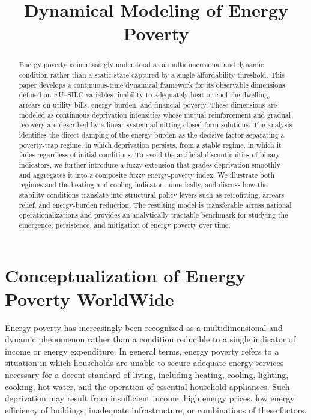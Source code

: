 \documentclass[11pt,a4paper]{article}
\title{Dynamical Modeling of Energy Poverty}
\author{}
\date{}
\begin{document}
\maketitle

\begin{abstract}
Energy poverty is increasingly understood as a multidimensional and dynamic
condition rather than a static state captured by a single affordability
threshold. This paper develops a continuous-time dynamical framework for its
observable dimensions defined on EU--SILC variables: inability to adequately
heat or cool the dwelling, arrears on utility bills, energy burden, and
financial poverty. These dimensions are modeled as continuous deprivation
intensities whose mutual reinforcement and gradual recovery are described by a
linear system admitting closed-form solutions. The analysis identifies the
direct damping of the energy burden as the decisive factor separating a
poverty-trap regime, in which deprivation persists, from a stable regime, in
which it fades regardless of initial conditions. To avoid the artificial
discontinuities of binary indicators, we further introduce a fuzzy extension
that grades deprivation smoothly and aggregates it into a composite fuzzy
energy-poverty index. We illustrate both regimes and the heating and cooling
indicator numerically, and discuss how the stability conditions translate into
structural policy levers such as retrofitting, arrears relief, and energy-burden
reduction. The resulting model is transferable across national
operationalizations and provides an analytically tractable benchmark for
studying the emergence, persistence, and mitigation of energy poverty over time.
\end{abstract}
\section{Conceptualization of Energy Poverty WorldWide}

Energy poverty has increasingly been recognized as a multidimensional and dynamic phenomenon rather than a condition reducible to a single indicator of income or energy expenditure. In general terms, energy poverty refers to a situation in which households are unable to secure adequate energy services necessary for a decent standard of living, including heating, cooling, lighting, cooking, hot water, and the operation of essential household appliances. Such deprivation may result from insufficient income, high energy prices, low energy efficiency of buildings, inadequate infrastructure, or combinations of these factors.
\end{document}
